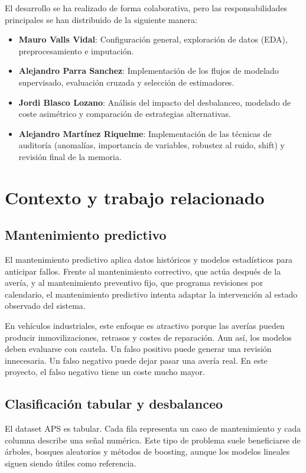 \documentclass[11pt,a4paper]{article}
\begin{document}
El desarrollo se ha realizado de forma colaborativa, pero las responsabilidades principales se han distribuido de la siguiente manera:
\begin{itemize}
    \item \textbf{Mauro Valls Vidal}: Configuración general, exploración de datos (EDA), preprocesamiento e imputación.
    \item \textbf{Alejandro Parra Sanchez}: Implementación de los flujos de modelado supervisado, evaluación cruzada y selección de estimadores.
    \item \textbf{Jordi Blasco Lozano}: Análisis del impacto del desbalanceo, modelado de coste asimétrico y comparación de estrategias alternativas.
    \item \textbf{Alejandro Martínez Riquelme}: Implementación de las técnicas de auditoría (anomalías, importancia de variables, robustez al ruido, shift) y revisión final de la memoria.
\end{itemize}

\section{Contexto y trabajo relacionado}
\label{sec_contexto}

\subsection{Mantenimiento predictivo}

El mantenimiento predictivo aplica datos históricos y modelos estadísticos para anticipar fallos. Frente al mantenimiento correctivo, que actúa después de la avería, y al mantenimiento preventivo fijo, que programa revisiones por calendario, el mantenimiento predictivo intenta adaptar la intervención al estado observado del sistema.

En vehículos industriales, este enfoque es atractivo porque las averías pueden producir inmovilizaciones, retrasos y costes de reparación. Aun así, los modelos deben evaluarse con cautela. Un falso positivo puede generar una revisión innecesaria. Un falso negativo puede dejar pasar una avería real. En este proyecto, el falso negativo tiene un coste mucho mayor.

\subsection{Clasificación tabular y desbalanceo}

El dataset APS es tabular. Cada fila representa un caso de mantenimiento y cada columna describe una señal numérica. Este tipo de problema suele beneficiarse de árboles, bosques aleatorios y métodos de boosting, aunque los modelos lineales siguen siendo útiles como referencia.
\end{document}
